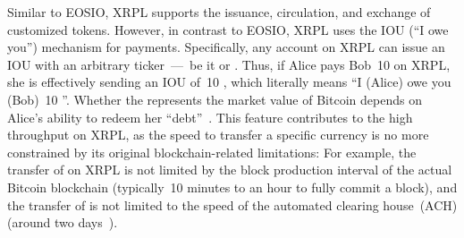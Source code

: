 Similar to EOSIO, XRPL supports the issuance, circulation, and exchange of customized tokens. 
However, in contrast to EOSIO, XRPL uses the IOU (``I owe you'') mechanism for payments. 
Specifically, any account on XRPL can issue an IOU with an arbitrary ticker~---~be it  or .
Thus, if Alice pays Bob~10  on XRPL, she is effectively sending an IOU of~10 , which literally means ``I (Alice) owe you (Bob)~10 ''. 
Whether the  represents the market value of Bitcoin depends on Alice's ability to redeem her ``debt''~\cite{XRPLedger2020}. 
This feature contributes to the high throughput on XRPL, as the speed to transfer a specific currency is no more constrained by its original blockchain-related limitations: For example, the transfer of  on XRPL is not limited by the block production interval of the actual Bitcoin blockchain (typically~10 minutes to an hour to fully commit a block), and the transfer of  is not limited to the speed of the automated clearing house~(ACH) (around two days~\cite{Love2013}).



